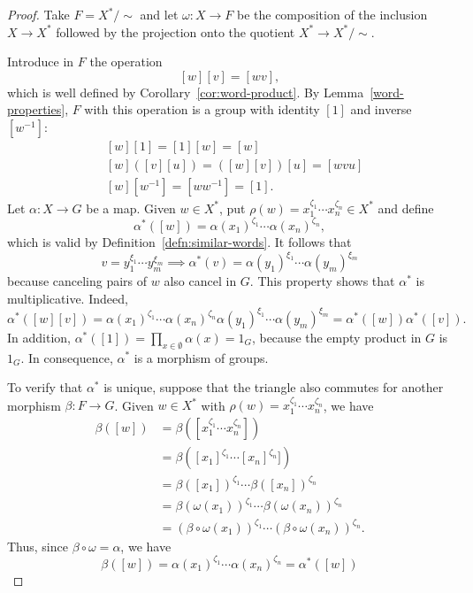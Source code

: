 \begin{proof}
    Take $F=X^*/{\sim}$ and let $\omega\colon X\to F$ be the composition of the inclusion $X\to X^*$ followed by the projection onto the quotient $X^*\to X^*/{\sim}$.
    
    Introduce in $F$ the operation
    $$
        [w][v] = [wv],
    $$
    which is well defined by Corollary~\ref{cor:word-product}. By Lemma~\ref{word-properties}, $F$ with this operation is a group with identity $[1]$ and inverse $[w^{-1}]$:
    \begin{align*}
        &[w][1] = [1][w] = [w]\\
        &[w]([v][u]) = ([w][v])[u] = [wvu]\\
        &[w][w^{-1}] = [ww^{-1}]=[1].
    \end{align*}
    Let $\alpha\colon X\to G$ be a map. Given $w\in X^*$, put $\rho(w)=x_1^{\zeta_1}\cdots x_n^{\zeta_n}\in X^*$ and define
    $$
        \alpha^*([w]) = \alpha(x_1)^{\zeta_1}
            \cdots\alpha(x_n)^{\zeta_n},
    $$
    which is valid by Definition~\ref{defn:similar-words}. It follows that
    \begin{equation}\label{eq:alpha-multiplication}
        v=y_1^{\xi_1}\cdots y_m^{\xi_m}
            \implies
            \alpha^*(v)=\alpha(y_1)^{\xi_1}\cdots\alpha(y_m)^{\xi_m}
    \end{equation}
    because canceling pairs of $w$ also cancel in $G$. This property shows that $\alpha^*$ is multiplicative. Indeed,
    $$
        \alpha^*([w][v])=\alpha(x_1)^{\zeta_1}\cdots\alpha(x_n)^{\zeta_n}
                \alpha(y_1)^{\xi_1}\cdots\alpha(y_m)^{\xi_m}
            = \alpha^*([w])\alpha^*([v]).
    $$
    In addition, $\alpha^*([1]) = \prod_{x\in\emptyset}\alpha(x)=1_G$, because the empty product in $G$ is $1_G$. In consequence, $\alpha^*$ is a morphism of groups.
        
    To verify that $\alpha^*$ is unique, suppose that the triangle also commutes for another morphism $\beta\colon F\to G$. Given $w\in X^*$ with $\rho(w)=x_1^{\zeta_1}\cdots x_n^{\zeta_n}$, we have
    \begin{align*}
        \beta([w]) &= \beta([x_1^{\zeta_1}\cdots x_n^{\zeta_n}])\\
            &= \beta([x_1]^{\zeta_1}\cdots[x_n]^{\zeta_n}])\\
            &= \beta([x_1])^{\zeta_1}\cdots\beta([x_n])^{\zeta_n}\\
            &= \beta(\omega(x_1))^{\zeta_1}\cdots
                \beta(\omega(x_n))^{\zeta_n}\\
            &= (\beta\circ\omega(x_1))^{\zeta_1}\cdots
                (\beta\circ\omega(x_n))^{\zeta_n}.
    \end{align*}
    Thus, since $\beta\circ\omega=\alpha$, we have
    $$
        \beta([w])=\alpha(x_1)^{\zeta_1}\cdots\alpha(x_n)^{\zeta_n}
                = \alpha^*([w])
    $$
\end{proof}



